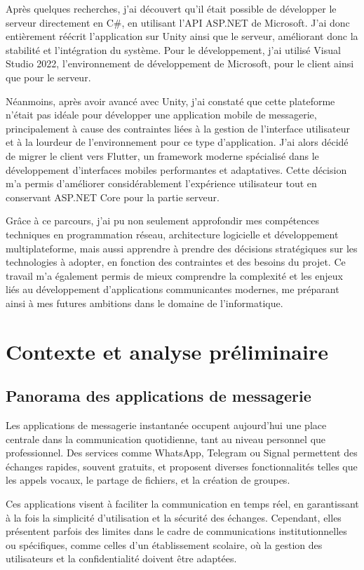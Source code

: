 \documentclass[12pt]{report}
\begin{document}
Après quelques recherches, j’ai découvert qu’il était possible de développer le serveur directement en C\#, en utilisant l’API ASP.NET de Microsoft. J’ai donc entièrement réécrit l’application sur Unity ainsi que le serveur, améliorant donc la stabilité et l’intégration du système. Pour le développement, j’ai utilisé Visual Studio 2022, l’environnement de développement de Microsoft, pour le client ainsi que pour le serveur.

Néanmoins, après avoir avancé avec Unity, j’ai constaté que cette plateforme n’était pas idéale pour développer une application mobile de messagerie, principalement à cause des contraintes liées à la gestion de l’interface utilisateur et à la lourdeur de l’environnement pour ce type d’application. J’ai alors décidé de migrer le client vers Flutter, un framework moderne spécialisé dans le développement d’interfaces mobiles performantes et adaptatives. Cette décision m’a permis d’améliorer considérablement l’expérience utilisateur tout en conservant ASP.NET Core pour la partie serveur.

Grâce à ce parcours, j’ai pu non seulement approfondir mes compétences techniques en programmation réseau, architecture logicielle et développement multiplateforme, mais aussi apprendre à prendre des décisions stratégiques sur les technologies à adopter, en fonction des contraintes et des besoins du projet. Ce travail m’a également permis de mieux comprendre la complexité et les enjeux liés au développement d’applications communicantes modernes, me préparant ainsi à mes futures ambitions dans le domaine de l’informatique.


\chapter{Contexte et analyse préliminaire}

\section{Panorama des applications de messagerie}

Les applications de messagerie instantanée occupent aujourd’hui une place centrale dans la communication quotidienne, tant au niveau personnel que professionnel. Des services comme WhatsApp, Telegram ou Signal permettent des échanges rapides, souvent gratuits, et proposent diverses fonctionnalités telles que les appels vocaux, le partage de fichiers, et la création de groupes.

Ces applications visent à faciliter la communication en temps réel, en garantissant à la fois la simplicité d’utilisation et la sécurité des échanges. Cependant, elles présentent parfois des limites dans le cadre de communications institutionnelles ou spécifiques, comme celles d’un établissement scolaire, où la gestion des utilisateurs et la confidentialité doivent être adaptées.
\end{document}
